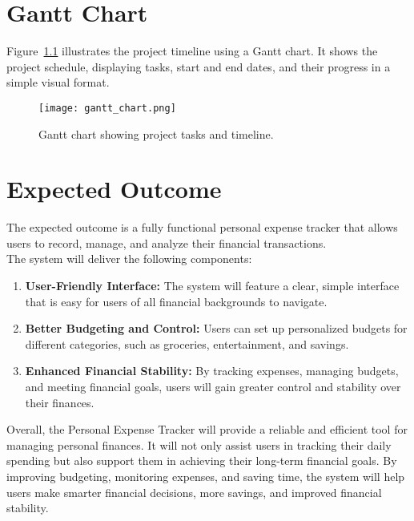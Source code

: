 \documentclass[12pt]{report} %
\begin{document}
\newpage

\chapter{Gantt Chart}
Figure~\ref{fig:gantt} illustrates the project timeline using a Gantt chart. It shows the project schedule, displaying tasks, start and end dates, and their progress in a simple visual format.

\begin{figure}[h!]
    \centering
    \texttt{[image: gantt\_chart.png]}
    \caption{Gantt chart showing project tasks and timeline.}
    \label{fig:gantt}
\end{figure}

\newpage

\chapter{Expected Outcome}
The expected outcome is a fully functional personal expense tracker that allows users to record, manage, and analyze their financial transactions. \\[3mm]
The system will deliver the following components:
\begin{enumerate}[label=\roman*., topsep=2pt, partopsep=0pt, itemsep=2pt, parsep=0pt]
    \renewcommand{\labelenumi}{\roman{enumi}.}
    \item \textbf{User-Friendly Interface:} The system will feature a clear, simple interface that is easy for users of all financial backgrounds to navigate.
    \item \textbf{Better Budgeting and Control:} Users can set up personalized budgets for different categories, such as groceries, entertainment, and savings.
    \item \textbf{Enhanced Financial Stability:} By tracking expenses, managing budgets, and meeting financial goals, users will gain greater control and stability over their finances.
\end{enumerate}

Overall, the Personal Expense Tracker will provide a reliable and efficient tool for managing personal finances. It will not only assist users in tracking their daily spending but also support them in achieving their long-term financial goals. By improving budgeting, monitoring expenses, and saving time, the system will help users make smarter financial decisions, more savings, and improved financial stability.
\end{document}
